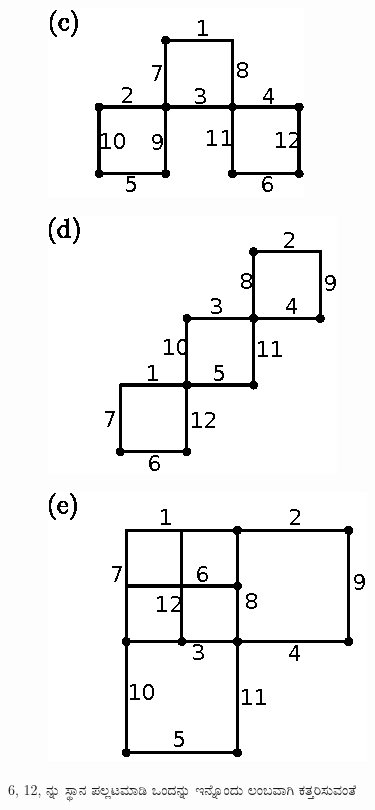 \begin{enumerate}
\begin{minipage}[c]{4cm}
\begin{figure}[H]
\end{figure}
\end{minipage}
\begin{minipage}[c]{5cm}
\begin{figure}[H]
\centering
\includegraphics{images/chap7/ans12c.eps}

\end{figure}
\end{minipage}

\begin{figure}[H]
\centering
\includegraphics{images/chap7/ans12d.eps}

\end{figure}


\begin{minipage}[c]{4cm}
\begin{figure}[H]
\centering
\includegraphics{images/chap7/ans12e.eps}
\end{figure}
\end{minipage}
\qquad
\begin{minipage}[c]{5cm}
6, 12, ನ್ನು ಸ್ಥಾನ ಪಲ್ಲಟಮಾಡಿ ಒಂದನ್ನು ಇನ್ನೊಂದು ಲಂಬವಾಗಿ ಕತ್ತರಿಸುವಂತೆ 


\end{minipage}
\end{enumerate}
